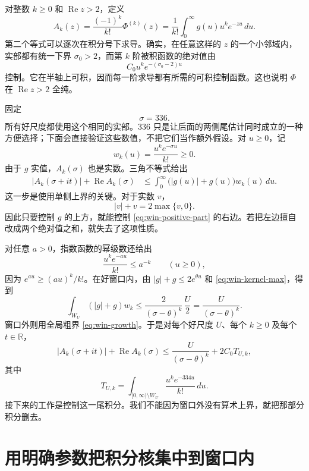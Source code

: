对整数 $k\ge0$ 和 $\operatorname{Re}z>2$，定义
\begin{equation}
 A_k(z)=\frac{(-1)^k}{k!}\Phi^{(k)}(z)
       =\frac1{k!}\int_0^\infty g(u)u^ke^{-zu}\,du.
 \label{eq:win-Ak}
\end{equation}
第二个等式可以逐次在积分号下求导。确实，在任意这样的 $z$ 的一个小邻域内，实部都有统一下界 $\sigma_0>2$，而第 $k$ 阶被积函数的绝对值由
\[
 C_0u^ke^{-(\sigma_0-2)u}
\]
控制。它在半轴上可积，因而每一阶求导都有所需的可积控制函数。这也说明 $\Phi$ 在 $\operatorname{Re}z>2$ 全纯。

固定
\begin{equation}
 \sigma=336.
 \label{eq:win-sigma}
\end{equation}
所有好尺度都使用这个相同的实部。$336$ 只是让后面的两侧尾估计同时成立的一种方便选择；下面会直接验证这些数值，不把它们当作额外假设。对 $u\ge0$，记
\[
 w_k(u)=\frac{u^ke^{-\sigma u}}{k!}\ge0.
\]
由于 $g$ 实值，$A_k(\sigma)$ 也是实数。三角不等式给出
\begin{align}
 |A_k(\sigma+it)|+\operatorname{Re}A_k(\sigma)
 &\le \int_0^\infty \bigl(|g(u)|+g(u)\bigr)w_k(u)\,du.
 \label{eq:win-positive-part}
\end{align}
这一步是使用单侧上界的关键。对于实数 $v$，
\[
 |v|+v=2\max\{v,0\}.
\]
因此只要控制 $g$ 的上方，就能控制 \eqref{eq:win-positive-part} 的右边。若把左边擅自改成两个绝对值之和，就失去了这项性质。

对任意 $a>0$，指数函数的幂级数还给出
\begin{equation}
 \frac{u^ke^{-au}}{k!}\le a^{-k}\qquad(u\ge0),
 \label{eq:win-kernel-max}
\end{equation}
因为 $e^{au}\ge(au)^k/k!$。在好窗口内，由
$|g|+g\le2e^{\theta u}$ 和 \eqref{eq:win-kernel-max}，得到
\[
 \int_{W_U}(|g|+g)w_k
 \le \frac{2}{(\sigma-\theta)^k}\,\frac U2
 =\frac{U}{(\sigma-\theta)^k}.
\]
窗口外则用全局粗界 \eqref{eq:win-growth}。于是对每个好尺度 $U$、每个 $k\ge0$ 及每个 $t\in\mathbb R$，
\begin{equation}
 |A_k(\sigma+it)|+\operatorname{Re}A_k(\sigma)
 \le \frac{U}{(\sigma-\theta)^k}+2C_0T_{U,k},
 \label{eq:win-before-tail}
\end{equation}
其中
\[
 T_{U,k}=
 \int_{[0,\infty)\setminus W_U}
       \frac{u^ke^{-334u}}{k!}\,du.
\]
接下来的工作是控制这一尾积分。我们不能因为窗口外没有算术上界，就把那部分积分删去。

\section{用明确参数把积分核集中到窗口内}

